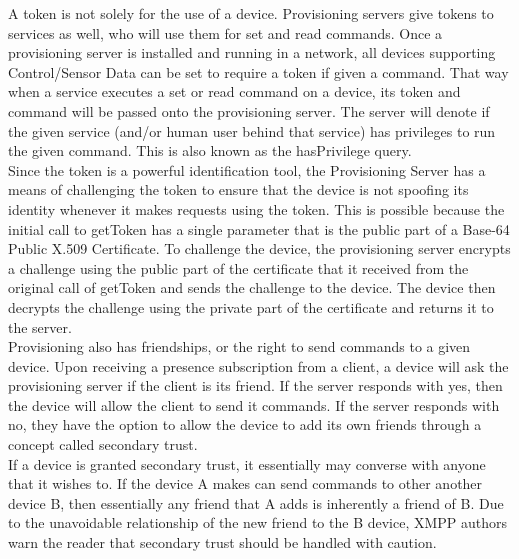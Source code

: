 A token is not solely for the use of a device. Provisioning servers give tokens to services as well, who will use them for set and read commands. Once a provisioning server is installed and running in a network, all devices supporting Control/Sensor Data can be set to require a token if given a command. That way when a service executes a set or read command on a device, its token and command will be passed onto the provisioning server. The server will denote if the given service (and/or human user behind that service) has privileges to run the given command. This is also known as the hasPrivilege query.\\
Since the token is a powerful identification tool, the Provisioning Server has a means of challenging the token to ensure that the device is not spoofing its identity whenever it makes requests using the token. This is possible because the initial call to getToken has a single parameter that is the public part of a Base-64 Public X.509 Certificate. To challenge the device, the provisioning server encrypts a challenge using the public part of the certificate that it received from the original call of getToken and sends the challenge to the device. The device then decrypts the challenge using the private part of the certificate and returns it to the server. \\
Provisioning also has friendships, or the right to send commands to a given device. Upon receiving a presence subscription from a client, a device will ask the provisioning server if the client is its friend. If the server responds with yes, then the device will allow the client to send it commands. If the server responds with no, they have the option to allow the device to add its own friends through a concept called secondary trust.\\
If a device is granted secondary trust, it essentially may converse with anyone that it wishes to. If the device A makes can send commands to other another device B, then essentially any friend that A adds is inherently a friend of B. Due to the unavoidable relationship of the new friend to the B device, XMPP authors warn the reader that secondary trust should be handled with caution.\\
